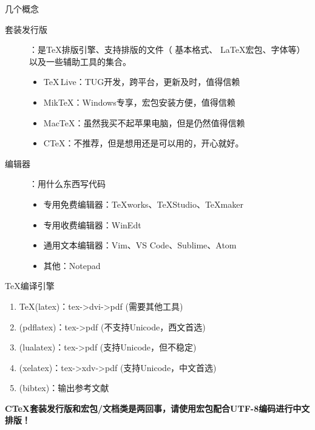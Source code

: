 \documentclass[UTF8,11pt]{ctexbeamer}
\begin{document}
\begin{frame}{几个概念}
	\begin{description}
		\item[套装发行版] ：是\TeX 排版引擎、支持排版的文件（ 基本格式、 \LaTeX 宏包、字体等）以及一些辅助工具的集合。
			\begin{itemize}
				\item {\color{red}\TeX \,Live}：TUG开发，跨平台，更新及时，值得信赖
				\item {\color{red}Mik\TeX}：Windows专享，宏包安装方便，值得信赖
				\item {\color{red}Mac\TeX}：虽然我买不起苹果电脑，但是仍然值得信赖
				\item {\color{red}CTeX}：不推荐，但是想用还是可以用的，开心就好。
			\end{itemize}
		\item[编辑器] ：用什么东西写代码
		\begin{itemize}
			\item 专用免费编辑器：TeXworks、TeXStudio、TeXmaker
			\item 专用收费编辑器：WinEdt
			\item 通用文本编辑器：Vim、VS Code、Sublime、Atom
			\item 其他：Notepad
		\end{itemize}	
	\end{description}

	
\end{frame}
\begin{frame}{\TeX 编译引擎}
	\begin{enumerate}
		\item \TeX (latex)：tex->dvi->pdf (需要其他工具)
		\item \pdfTeX (pdflatex)：tex->pdf (不支持Unicode，西文首选)
		\item \LuaTeX (lualatex)：tex->pdf (支持Unicode，但不稳定)
		\item \XeTeX (xelatex)：tex->xdv->pdf (支持Unicode，中文首选)
		\item \BibTeX (bibtex)：输出参考文献
	\end{enumerate}
	\bfseries CTeX套装发行版和\CTeX 宏包/文档类是两回事，请使用\CTeX 宏包配合UTF-8编码进行中文排版！
\end{frame}
\end{document}
